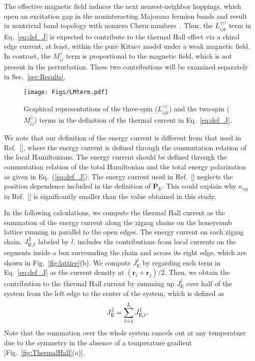 \documentclass[twocolumn,superscriptaddress,showpacs, longbibliography, aps, prx]{revtex4-2}
\def\vec#1{\boldsymbol #1}
\begin{document}
The effective magnetic field induces the next nearest-neighbor hoppings, which open an excitation gap in the noninteracting Majorana fermion bands and result in nontrivial band topology with nonzero Chern numbers~\cite{Kitaev2006}.
Thus, the $L_{ijk}^{\gamma\gamma'}$ term in Eq.~\eqref{eq:def_J} is expected to contribute to the thermal Hall effect via a chiral edge current, at least, within the pure Kitaev model under a weak magnetic field. 
In contrast, the $M_{ij}^{\gamma}$ term is proportional to the magnetic field, which is not present in the perturbation. 
These two contributions will be examined separately in Sec.~\ref{sec:Results}.

\begin{figure}
  \begin{center}
    \texttt{[image: Figs/LMterm.pdf]}    
  \end{center}
  \caption{
  Graphical representations of the three-spin ($L_{ijk}^{\gamma\gamma^\prime}$) and the two-spin ($M_{ij}^\gamma$) terms in the definition of the thermal current in Eq.~\eqref{eq:def_J}.
  }
  \label{fig:LM_term}
\end{figure}


We note that our definition of the energy current is different from that used in Ref.~[], where the energy current is defined through the commutation relation of the local Hamiltonians.
The energy current should be defined through the commutation relation of the total Hamiltonian and the total energy polarization as given in Eq.~(\ref{eq:def_J}). 
The energy current used in Ref.~[] neglects the position dependence included in the definition of $\vec{P}_{\mathrm{E}}$.
This could explain why $\kappa_{xy}$ in Ref.~[] is significantly smaller than the value obtained in this study.

In the following calculations, we compute the thermal Hall current as the summation of the energy current along the zigzag chains on the honeycomb lattice running in parallel to the open edges. 
The energy current on each zigzag chain, $J_{{\rm E},l}^\parallel$ labeled by $l$, includes the contributions from local currents on the segments inside a box surrounding the chain and across its right edge, which are shown in Fig.~\ref{fig:lattice}(b). 
We compute {$J_{\mathrm{E}}^{\parallel}$} by regarding each term in Eq.~\eqref{eq:def_J} as the current density at $(\bm{r}_i + \bm{r}_j)/2$. Then, we obtain the contribution to the thermal Hall current by summing up $J_{\mathrm{E}}^{\parallel}$ over half of the system from the left edge to the center of the system, which is defined as
\begin{align}
J_{\rm E}^\parallel=\sum_{l=1}^{L}J_{{\rm E},l}^\parallel.
\label{eq:JE}
\end{align} 
Note that the summation over the whole system cancels out at any temperature due to the symmetry in the absence of a temperature gradient [Fig.~\ref{fig:ThermalHall}(a)]. 
\end{document}
